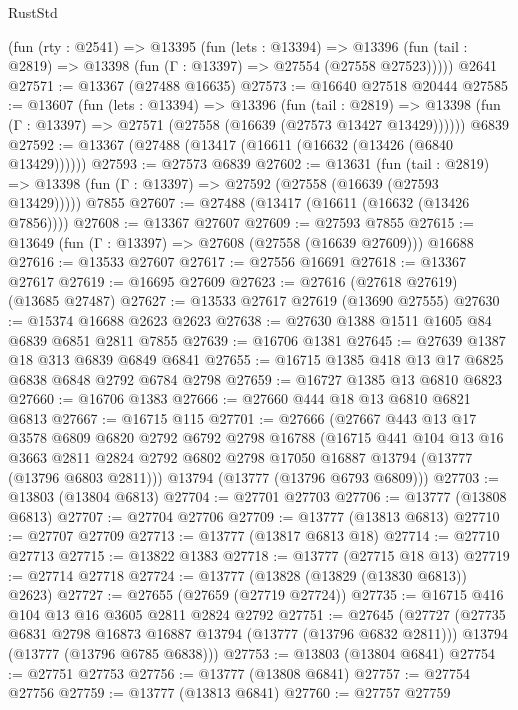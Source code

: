 \begin{lexlean}{RustStd}
\begin{coremodule}
    (fun (rty : @2541) =>
    @13395
      (fun (lets : @13394) =>
      @13396 (fun (tail : @2819) => @13398 (fun (Γ : @13397) => @27554 (@27558 @27523)))))
    @2641
@27571 := @13367 (@27488 @16635)
@27573 := @16640 @27518 @20444
@27585 := @13607
    (fun (lets : @13394) =>
    @13396
      (fun (tail : @2819) =>
      @13398 (fun (Γ : @13397) => @27571 (@27558 (@16639 (@27573 @13427 @13429))))))
    @6839
@27592 := @13367 (@27488 (@13417 (@16611 (@16632 (@13426 (@6840 @13429))))))
@27593 := @27573 @6839
@27602 := @13631
    (fun (tail : @2819) => @13398 (fun (Γ : @13397) => @27592 (@27558 (@16639 (@27593 @13429)))))
    @7855
@27607 := @27488 (@13417 (@16611 (@16632 (@13426 @7856))))
@27608 := @13367 @27607
@27609 := @27593 @7855
@27615 := @13649 (fun (Γ : @13397) => @27608 (@27558 (@16639 @27609))) @16688
@27616 := @13533 @27607
@27617 := @27556 @16691
@27618 := @13367 @27617
@27619 := @16695 @27609
@27623 := @27616 (@27618 @27619) (@13685 @27487)
@27627 := @13533 @27617 @27619 (@13690 @27555)
@27630 := @15374 @16688 @2623 @2623
@27638 := @27630 @1388 @1511 @1605 @84 @6839 @6851 @2811 @7855
@27639 := @16706 @1381
@27645 := @27639 @1387 @18 @313 @6839 @6849 @6841
@27655 := @16715 @1385 @418 @13 @17 @6825 @6838 @6848 @2792 @6784 @2798
@27659 := @16727 @1385 @13 @6810 @6823
@27660 := @16706 @1383
@27666 := @27660 @444 @18 @13 @6810 @6821 @6813
@27667 := @16715 @115
@27701 := @27666
    (@27667
      @443
      @13
      @17
      @3578
      @6809
      @6820
      @2792
      @6792
      @2798
      @16788
      (@16715
        @441
        @104
        @13
        @16
        @3663
        @2811
        @2824
        @2792
        @6802
        @2798
        @17050
        @16887
        @13794
        (@13777 (@13796 @6803 @2811)))
      @13794
      (@13777 (@13796 @6793 @6809)))
@27703 := @13803 (@13804 @6813)
@27704 := @27701 @27703
@27706 := @13777 (@13808 @6813)
@27707 := @27704 @27706
@27709 := @13777 (@13813 @6813)
@27710 := @27707 @27709
@27713 := @13777 (@13817 @6813 @18)
@27714 := @27710 @27713
@27715 := @13822 @1383
@27718 := @13777 (@27715 @18 @13)
@27719 := @27714 @27718
@27724 := @13777 (@13828 (@13829 (@13830 @6813)) @2623)
@27727 := @27655 (@27659 (@27719 @27724))
@27735 := @16715 @416 @104 @13 @16 @3605 @2811 @2824 @2792
@27751 := @27645
    (@27727
      (@27735 @6831 @2798 @16873 @16887 @13794 (@13777 (@13796 @6832 @2811)))
      @13794
      (@13777 (@13796 @6785 @6838)))
@27753 := @13803 (@13804 @6841)
@27754 := @27751 @27753
@27756 := @13777 (@13808 @6841)
@27757 := @27754 @27756
@27759 := @13777 (@13813 @6841)
@27760 := @27757 @27759

\end{coremodule}
\end{lexlean}
